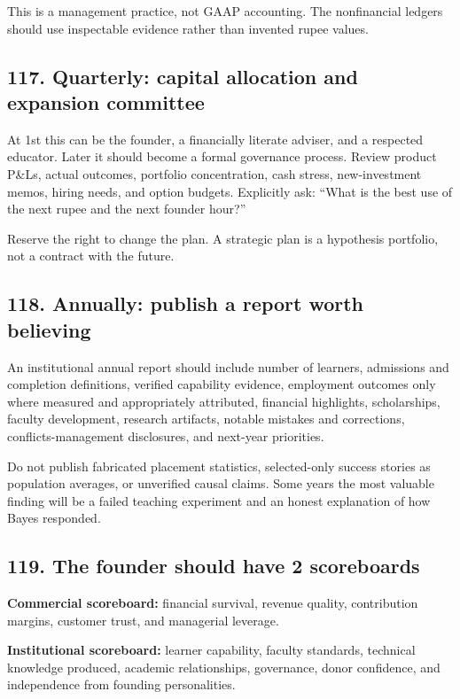 This is a management practice, not GAAP accounting. The nonfinancial ledgers should use inspectable evidence rather than invented rupee values.

\subsection{117. Quarterly: capital allocation and expansion committee}

At 1st this can be the founder, a financially literate adviser, and a respected educator. Later it should become a formal governance process. Review product P\&Ls, actual outcomes, portfolio concentration, cash stress, new-investment memos, hiring needs, and option budgets. Explicitly ask: ``What is the best use of the next rupee and the next founder hour?''

Reserve the right to change the plan. A strategic plan is a hypothesis portfolio, not a contract with the future.

\subsection{118. Annually: publish a report worth believing}

An institutional annual report should include number of learners, admissions and completion definitions, verified capability evidence, employment outcomes only where measured and appropriately attributed, financial highlights, scholarships, faculty development, research artifacts, notable mistakes and corrections, conflicts-management disclosures, and next-year priorities.

Do not publish fabricated placement statistics, selected-only success stories as population averages, or unverified causal claims. Some years the most valuable finding will be a failed teaching experiment and an honest explanation of how Bayes responded.

\subsection{119. The founder should have 2 scoreboards}

\textbf{Commercial scoreboard:} financial survival, revenue quality, contribution margins, customer trust, and managerial leverage.

\textbf{Institutional scoreboard:} learner capability, faculty standards, technical knowledge produced, academic relationships, governance, donor confidence, and independence from founding personalities.

